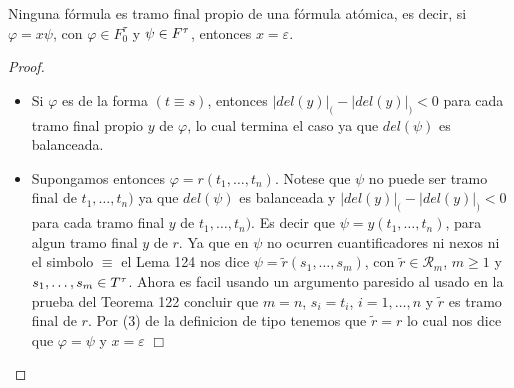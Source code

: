   \begin{lemma} \label{lemma_38}
    \PN Ninguna fórmula es tramo final propio de una fórmula atómica, es decir, si $\varphi = x \psi$, con $\varphi \in
    F_{0}^{\tau}$ y $\psi \in F^{\tau}$, entonces $x = \varepsilon$.
  \end{lemma}
  \begin{proof}
    \begin{itemize}
      \item Si $\varphi$ es de la forma $(t\equiv s)$, entonces $\lvert del(y)\rvert_{(}-\lvert del(y)\rvert_{)}< 0$ para cada tramo final propio $y$ de $\varphi $, lo cual termina el caso ya que $del(\psi )$ es balanceada.
      \item Supongamos entonces $\varphi =r(t_{1}, \dotsc, t_{n})$. Notese que $\psi $ no puede ser tramo final de $t_{1}, \dotsc, t_{n})$ ya que $del(\psi )$ es balanceada y $\lvert del(y)\rvert_{(}-\lvert del(y)\rvert_{)}< 0$ para cada tramo final $y$ de $t_{1}, \dotsc, t_{n})$. Es decir que $\psi =y(t_{1}, \dotsc, t_{n})$, para algun tramo final $y$ de $r$. Ya que en $\psi $ no ocurren cuantificadores ni nexos ni el simbolo $\equiv $ el Lema 124 nos dice $\psi =\tilde{r}(s_{1}, \dotsc,s_{m})$, con $ \tilde{r}\in \mathcal{R}_{m}$, $m\geq 1$ y $s_{1}, \dotsc,s_{m}\in T^{\tau}$. Ahora es facil usando un argumento paresido al usado en la prueba del Teorema 122 concluir que $m=n$, $s_{i}=t_{i}$, $ i=1, \dotsc,n$ y $\tilde{r}$ es tramo final de $r$. Por (3) de la definicion de tipo tenemos que $\tilde{r}=r$ lo cual nos dice que $\varphi =\psi $ y $ x=\varepsilon $ $\Box$
    \end{itemize}
  \end{proof}

